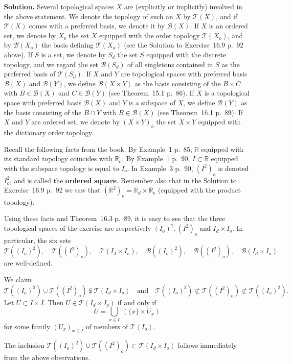 \documentclass[12pt,letterpaper]{article}
\newcommand{\B}{\mathcal B}
\newcommand{\mc}{\mathcal}
\newcommand{\noi}{\noindent}%
\newcommand{\R}{\mathbb R}
\newcommand{\T}{\mathcal T}
\begin{document}
\noi\textbf{Solution.} Several topological spaces $X$ are (explicitly or implicitly) involved in the above statement. We denote the topology of such an $X$ by $\T(X)$, and if $\T(X)$ comes with a preferred basis, we denote it by $\B(X)$. If $X$ is an ordered set, we denote by $X_o$ the set $X$ equipped with the order topology $\T(X_o)$, and by $\B(X_o)$ the basis defining $\mc T(X_o)$ (see the Solution to Exercise~16.9 p.~92 above). If $S$ is a set, we denote by $S_d$ the set $S$ equipped with the discrete topology, and we regard the set $\mc B(S_d)$ of all singletons contained in $S$ as the preferred basis of $\mc T(S_d)$. If $X$ and $Y$ are topological spaces with preferred basis $\B(X)$ and $\B(Y)$, we define $\B(X\times Y)$ as the basis consisting of the $B\times C$ with $B\in\mc B(X)$ and $C\in\mc B(Y)$ (see Theorem~15.1 p.~86). If $X$ is a topological space with preferred basis $\B(X)$ and $Y$ is a subspace of $X$, we define $\B(Y)$ as the basis consisting of the $B\cap Y$ with $B\in\mc B(X)$ (see Theorem~16.1 p.~89). If $X$ and $Y$ are ordered set, we denote by $(X\times Y)_o$ the set $X\times Y$ equipped with the dictionary order topology. 

Recall the following facts from the book. By Example~1 p.~85, $\R$ equipped with its standard topology coincides with $\R_o$. By Example~1 p.~90, $I\subset\R$ equipped with the subspace topology is equal to $I_o$. In Example~3 p.~90, $(I^2)_o$ is denoted $I_o^2$, and is called the \textbf{ordered square}. Remember also that in the Solution to Exercise~16.9 p.~92 we saw that $(\R^2)_o=\R_d\times\R_o$ (equipped with the product topology). 

Using these facts and Theorem~16.3 p.~89, it is easy to see that the three topological spaces of the exercise are respectively $(I_o)^2,(I^2)_o$ and $I_d\times I_o$. In particular, the six sets 
$$
\T((I_o)^2),\quad\T((I^2)_o),\quad\T(I_d\times I_o),\quad\B((I_o)^2),\quad\B((I^2)_o),\quad\B(I_d\times I_o)
$$ 
are well-defined. 

We claim 
$$
\mc T((I_o)^2)\cup\mc T((I^2)_o)\subsetneqq\mc T(I_d\times I_o)\quad\text{and}\quad\mc T((I_o)^2)\not\subset\mc T((I^2)_o)\not\subset\mc T((I_o)^2).
$$ 
Let $U\subset I\times I$. Then $U\in\mc T(I_d\times I_o)$ if and only if 
$$
U=\bigcup_{x\in I}\ (\{x\}\times U_x)
$$ 
for some family $(U_x)_{x\in I}$ of members of $\mc T(I_o)$. 

The inclusion $\mc T((I_o)^2)\cup\mc T((I^2)_o)\subset\mc T(I_d\times I_o)$ follows immediately from the above observations. 
\end{document}
